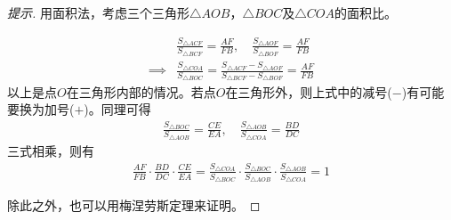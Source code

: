 \begin{proof}[提示]
  用面积法，考虑三个三角形$\triangle AOB$，$\triangle BOC$及$\triangle COA$的面积比。

  \begin{align*}
    & \frac{S_{\triangle ACF}}{S_{\triangle BCF}} = \frac{AF}{FB},\quad
      \frac{S_{\triangle AOF}}{S_{\triangle BOF}} = \frac{AF}{FB}\\
    \implies &
    \frac{S_{\triangle COA}}{S_{\triangle BOC}} = \frac{S_{\triangle ACF} - S_{\triangle AOF}}{S_{\triangle BCF}-S_{\triangle BOF}} = \frac{AF}{FB}
  \end{align*}
  以上是点$O$在三角形内部的情况。若点$O$在三角形外，则上式中的减号($-$)有可能要换为加号($+$)。同理可得
  \begin{align*}
    \frac{S_{\triangle BOC}}{S_{\triangle AOB}} = \frac{CE}{EA},\quad
    \frac{S_{\triangle AOB}}{S_{\triangle COA}} = \frac{BD}{DC}
  \end{align*}
  三式相乘，则有
  \begin{align*}
    \frac{AF}{FB}\cdot\frac{BD}{DC}\cdot\frac{CE}{EA}=
    \frac{S_{\triangle COA}}{S_{\triangle BOC}} \cdot
    \frac{S_{\triangle BOC}}{S_{\triangle AOB}} \cdot
    \frac{S_{\triangle AOB}}{S_{\triangle COA}} = 1
  \end{align*}

  除此之外，也可以用梅涅劳斯定理来证明。
\end{proof}

